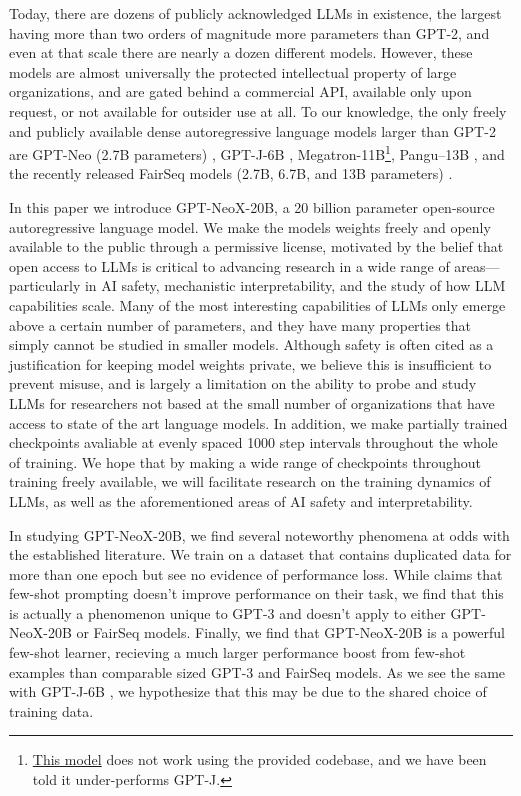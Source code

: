 \documentclass[11pt]{article}
\newcommand{\model}{GPT-NeoX-20B}
\begin{document}
Today, there are dozens of publicly acknowledged LLMs in existence, the largest having more than two orders of magnitude more parameters than GPT-2, and even at that scale there are nearly a dozen different models. However, these models are almost universally the protected intellectual property of large organizations, and are gated behind a commercial API, available only upon request, or not available for outsider use at all. To our knowledge, the only freely and publicly available dense autoregressive language models larger than GPT-2 are GPT-Neo (2.7B parameters) \citep{black2021gpt}, GPT-J-6B \citep{gpt-j}, Megatron-11B\footnote{\href{https://github.com/pytorch/fairseq/tree/main/examples/megatron\_11b}{This model} does not work using the provided codebase, and we have been told it under-performs GPT-J.}, Pangu--13B \citep{zeng2021pangualpha}, and the recently released FairSeq models (2.7B, 6.7B, and 13B parameters) \citep{fairseq-13B}.

In this paper we introduce \model{}, a 20 billion parameter open-source autoregressive language model. We make the models weights freely and openly available to the public through a permissive license, motivated by the belief that open access to LLMs is critical to advancing research in a wide range of areas---particularly in AI safety, mechanistic interpretability, and the study of how LLM capabilities scale. Many of the most interesting capabilities of LLMs only emerge above a certain number of parameters, and they have many properties that simply cannot be studied in smaller models. Although safety is often cited as a justification for keeping model weights private, we believe this is insufficient to prevent misuse, and is largely a limitation on the ability to probe and study LLMs for researchers not based at the small number of organizations that have access to state of the art language models. In addition, we make partially trained checkpoints avaliable at evenly spaced 1000 step intervals throughout the whole of training. We hope that by making a wide range of checkpoints throughout training freely available, we will facilitate research on the training dynamics of LLMs, as well as the aforementioned areas of AI safety and interpretability.

In studying \model{}, we find several noteworthy phenomena at odds with the established literature. We train on a dataset that contains duplicated data for more than one epoch but see no evidence of performance loss. While \citep{hendrycks2020measuring} claims that few-shot prompting doesn't improve performance on their task, we find that this is actually a phenomenon unique to GPT-3 and doesn't apply to either \model{} or FairSeq models. Finally, we find that \model{} is a powerful few-shot learner, recieving a much larger performance boost from few-shot examples than comparable sized GPT-3 and FairSeq models. As we see the same with GPT-J-6B \citep{gpt-j}, we hypothesize that this may be due to the shared choice of training data.
\end{document}

